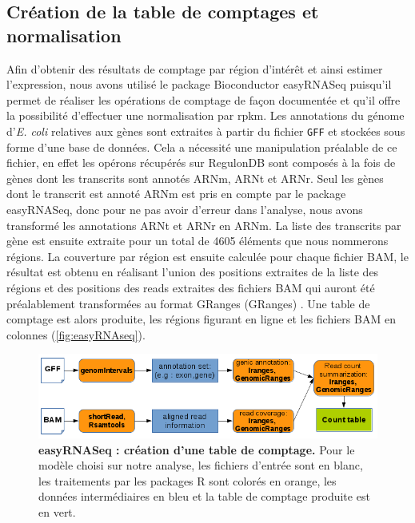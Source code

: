 \documentclass[12pt,a4paper]{report}
\begin{document}
\begin{onehalfspace}
\subsection*{Création de la table de comptages et normalisation}
Afin d'obtenir des résultats de comptage par région d'intérêt et ainsi estimer l'expression, nous avons utilisé le package Bioconductor easyRNASeq \citep{Delhomme2012} puisqu'il permet de réaliser les opérations de comptage de façon documentée et qu'il offre la possibilité d'effectuer une normalisation par \gls{rpkm}. Les annotations du génome d'\textit{E. coli} relatives aux gènes sont extraites à partir du fichier \texttt{GFF} et stockées sous forme d'une base de données. Cela a nécessité une manipulation préalable de ce fichier, en effet les opérons récupérés sur RegulonDB sont composés à la fois de gènes dont les transcrits sont annotés ARNm, ARNt et ARNr. Seul les gènes dont le transcrit est annoté ARNm est pris en compte par le package easyRNASeq, donc pour ne pas avoir d'erreur dans l'analyse, nous avons transformé les annotations ARNt et ARNr en ARNm.
La liste des transcrits par gène est ensuite extraite pour un total de 4605 éléments que nous nommerons régions. La couverture par région est ensuite calculée pour chaque fichier BAM, le résultat est obtenu en réalisant l'union des positions extraites de la liste des régions et des positions des reads extraites des fichiers BAM qui auront été préalablement transformées au format \gls{GRanges} (GRanges)  \citep{Lawrence2013}. Une table de comptage est alors produite, les régions figurant en ligne et les fichiers BAM en colonnes (\autoref{fig:easyRNAseq}).

\begin{figure}[ht]
\centerline{\includegraphics[scale=0.7]{figures/easy.png}}
\caption{\textbf{easyRNASeq : création d'une table de comptage.} Pour le modèle choisi sur notre analyse, les fichiers d'entrée sont en blanc, les traitements par les packages R sont colorés en orange, les données intermédiaires en bleu et la table de comptage produite est en vert.}
\label{fig:easyRNAseq} 
\end{figure}


\end{onehalfspace}
\end{document}
